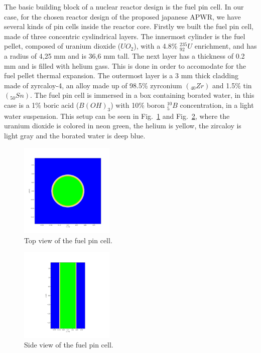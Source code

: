 \documentclass[twocolumn,a4paper,10pt]{article}
\begin{document}
The basic building block of a nuclear reactor design is the fuel pin cell. In our case, for the chosen reactor design of the proposed japanese APWR, we have several kinds of pin cells inside the reactor core. Firstly we built the fuel pin cell, made of three concentric cyslindrical layers. The innermost cylinder is the fuel pellet, composed of uranium dioxide ($UO_2$), with a 4.8\% $^{235}_{92}U$ enrichment, and has a radius of 4,25 mm and is 36,6 mm tall. The next layer has a thickness of 0.2 mm and is filled with helium gass. This is done in order to accomodate for the fuel pellet thermal expansion. The outermost layer is a 3 mm thick cladding made of zyrcaloy-4, an alloy made up of 98.5\% zyrconium $(_{40}Zr)$ and 1.5\% tin $(_{50}Sn)$. The fuel pin cell is immersed in a box containing borated water, in this case is a 1\% boric acid ($B(OH)_3$) with 10\% boron $^{10}_{5}B$ concentration, in a light water suspension. This setup can be seen in Fig.~\ref{fig:fuelpinxy} and Fig.~\ref{fig:fuelpinyz}, where the uranium dioxide is colored in neon green, the helium is yellow, the zircaloy is light gray and the borated water is deep blue.

\newpage

\begin{figure}[ht]
  \centering
  \includegraphics[width=0.4\textwidth]{../Pictures/Fuelrods_plot_xy.png}
  \caption{Top view of the fuel pin cell.}
  \label{fig:fuelpinxy}
\end{figure}

\begin{figure}[ht]
  \centering
  \includegraphics[width=0.4\textwidth]{../Pictures/Fuelrods_plot_yz.png}
  \caption{Side view of the fuel pin cell.}
  \label{fig:fuelpinyz}
\end{figure}
\end{document}
